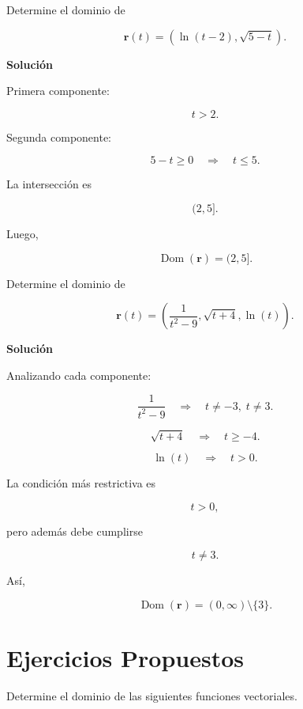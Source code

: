 \begin{ejercicio}[]

Determine el dominio de

\[
\mathbf{r}(t)=
\left(
\ln(t-2),
\sqrt{5-t}
\right).
\]

\textbf{Solución}

Primera componente:

\[
t>2.
\]

Segunda componente:

\[
5-t\ge0
\quad\Longrightarrow\quad
t\le5.
\]

La intersección es

\[
(2,5].
\]

Luego,

\[
\boxed{\operatorname{Dom}(\mathbf{r})=(2,5].}
\]

\end{ejercicio}

\begin{ejercicio}[]

Determine el dominio de

\[
\mathbf{r}(t)=
\left(
\frac1{t^2-9},
\sqrt{t+4},
\ln(t)
\right).
\]

\textbf{Solución}

Analizando cada componente:

\[
\frac1{t^2-9}
\quad\Rightarrow\quad
t\neq-3,\;t\neq3.
\]

\[
\sqrt{t+4}
\quad\Rightarrow\quad
t\ge-4.
\]

\[
\ln(t)
\quad\Rightarrow\quad
t>0.
\]

La condición más restrictiva es

\[
t>0,
\]

pero además debe cumplirse

\[
t\neq3.
\]

Así,

\[
\boxed{\operatorname{Dom}(\mathbf{r})=(0,\infty)\setminus\{3\}.}
\]
\end{ejercicio}

\section*{Ejercicios Propuestos}

Determine el dominio de las siguientes funciones vectoriales.

